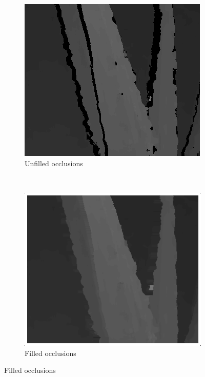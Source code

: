 \begin{figure}
  \begin{subfigure}[b]{0.48\textwidth}
    \centering
    \includegraphics[width=\textwidth]{images/no-fill-zoomed.png}
    \caption{Unfilled occlusions}
  \end{subfigure}
  ~
  \begin{subfigure}[b]{0.48\textwidth}
    \centering
    \includegraphics[width=\textwidth]{images/fill-zoomed.png}
    \caption{Filled occlusions}
  \end{subfigure}


\end{figure}



